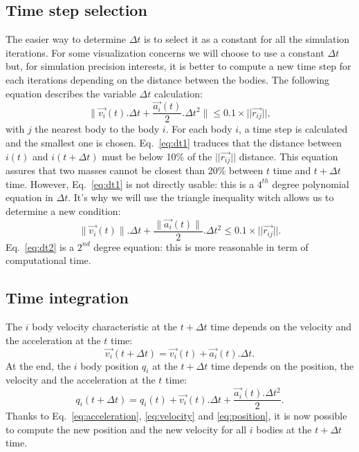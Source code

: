 \subsection{Time step selection}
The easier way to determine $\Delta t$ is to select it as a constant for all the simulation iterations.
For some visualization concerns we will choose to use a constant $\Delta t$ but, for simulation precision interests, it is better to compute a new time step for each iterations depending on the distance between the bodies.
The following equation describes the variable $\Delta t$ calculation:
\begin{equation}
\label{eq:dt1}
	\|\vec{v_i}(t) . \Delta t + \frac{\vec{a_i}(t)}{2} . \Delta t^2 \| \leq 0.1 \times ||\vec{r_{ij}}||,
\end{equation}
with $j$ the nearest body to the body $i$.
For each body $i$, a time step is calculated and the smallest one is chosen.
Eq.~\ref{eq:dt1} traduces that the distance between $i(t)$ and $i(t + \Delta t)$ must be below 10\% of the $||\vec{r_{ij}}||$ distance.
This equation assures that two masses cannot be closest than 20\% between $t$ time and $t + \Delta t$ time.
However, Eq.~\ref{eq:dt1} is not directly usable: this is a $4^{th}$ degree polynomial equation in $\Delta t$.
It's why we will use the triangle inequality witch allows us to determine a new condition:
\begin{equation}
\label{eq:dt2}
	\|\vec{v_i}(t)\| . \Delta t + \frac{\|\vec{a_i}(t)\|}{2} . \Delta t^2  \leq 0.1 \times ||\vec{r_{ij}}||.
\end{equation}
Eq.~\ref{eq:dt2} is a $2^{nd}$ degree equation: this is more reasonable in term of computational time.

\subsection{Time integration}
The $i$ body velocity characteristic at the $t + \Delta t$ time depends on the velocity and the acceleration at the $t$ time:
\begin{equation}
\label{eq:velocity}
	\vec{v_i}(t + \Delta t) = \vec{v_{i}}(t) + \vec{a_i}(t) . \Delta t.
\end{equation}
At the end, the $i$ body position $q_i$ at the $t + \Delta t$ time depends on the position, the velocity and the acceleration at the $t$ time:
\begin{equation}
\label{eq:position}
	q_i(t + \Delta t) = q_{i}(t) + \vec{v_{i}}(t) . \Delta t + \frac{\vec{a_i}(t) . \Delta t^2}{2}.
\end{equation}
Thanks to Eq.~\ref{eq:acceleration}, \ref{eq:velocity} and \ref{eq:position}, it is now possible to compute the new position and the new velocity for all $i$ bodies at the $t + \Delta t$ time.
